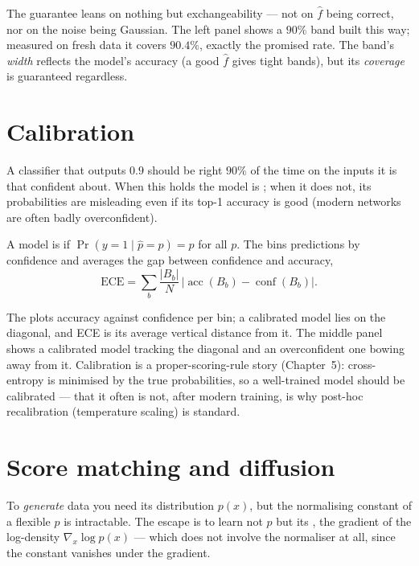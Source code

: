 \documentclass[11pt]{article}
\begin{document}
The guarantee leans on nothing but exchangeability --- not on $\hat f$ being
correct, nor on the noise being Gaussian. The left panel shows a $90\%$ band built
this way; measured on fresh data it covers $90.4\%$, exactly the promised rate.
The band's \emph{width} reflects the model's accuracy (a good $\hat f$ gives tight
bands), but its \emph{coverage} is guaranteed regardless.

\section{Calibration}

A classifier that outputs $0.9$ should be right $90\%$ of the time on the inputs
it is that confident about. When this holds the model is ; when
it does not, its probabilities are misleading even if its top-1 accuracy is good
(modern networks are often badly overconfident).

\begin{definition}
A model is  if $\Pr(y=1\mid \hat p = p)=p$ for all $p$. The
 bins predictions by confidence and averages
the gap between confidence and accuracy,
\[
  \mathrm{ECE} = \sum_{b} \frac{|B_b|}{N}\,\big|\operatorname{acc}(B_b) - \operatorname{conf}(B_b)\big|.
\]
\end{definition}

The  plots accuracy against confidence per bin; a
calibrated model lies on the diagonal, and ECE is its average vertical distance
from it. The middle panel shows a calibrated model tracking the diagonal and an
overconfident one bowing away from it. Calibration is a proper-scoring-rule story
(Chapter~5): cross-entropy is minimised by the true probabilities, so a
well-trained model should be calibrated --- that it often is not, after modern
training, is why post-hoc recalibration (temperature scaling) is standard.

\section{Score matching and diffusion}

To \emph{generate} data you need its distribution $p(x)$, but the normalising
constant of a flexible $p$ is intractable. The escape is to learn not $p$ but its
, the gradient of the log-density $\nabla_x\log p(x)$ --- which does
not involve the normaliser at all, since the constant vanishes under the
gradient.
\end{document}
